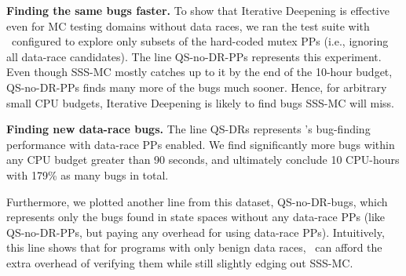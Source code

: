 {\bf Finding the same bugs faster.}
To show that Iterative Deepening is effective even for MC testing domains without data races, %
we ran the test suite with \quicksand~configured to explore only subsets of the hard-coded mutex PPs
(i.e., ignoring all data-race candidates).
%
The line QS-no-DR-PPs represents this experiment.
Even though SSS-MC mostly catches up to it by the end of the 10-hour budget,
QS-no-DR-PPs finds many more of the bugs much sooner.
Hence, for arbitrary small CPU budgets,
Iterative Deepening is likely to find bugs SSS-MC will miss.


{\bf Finding new data-race bugs.}
The line QS-DRs represents \quicksand's bug-finding performance
with data-race PPs enabled.
We find significantly more bugs within any CPU budget greater than 90 seconds,
and ultimately conclude 10 CPU-hours with 179\% as many bugs in total.

Furthermore, we plotted another line from this dataset, QS-no-DR-bugs,
which represents only the bugs found in state spaces without any data-race PPs (like QS-no-DR-PPs, but paying any overhead for using data-race PPs).
Intuitively, this line shows that for programs with only benign data races,
\quicksand~can afford the extra overhead of verifying them while still slightly edging out SSS-MC.


